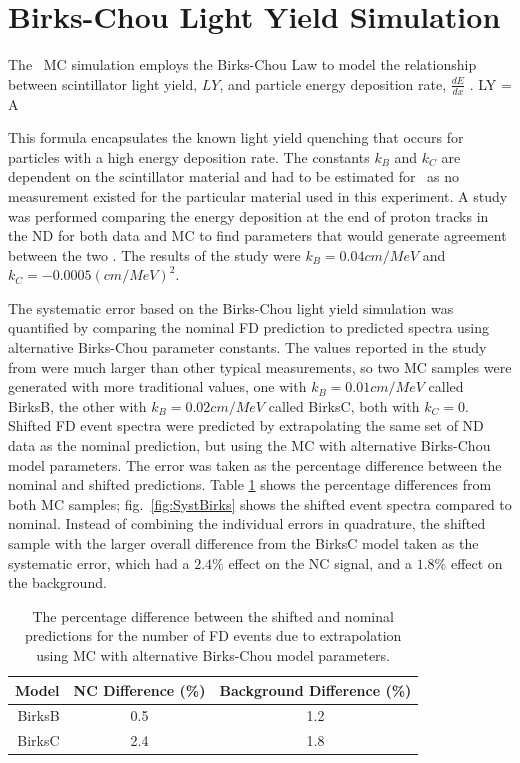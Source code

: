 \section{Birks-Chou Light Yield Simulation}

The \nova~MC simulation employs the Birks-Chou Law to model the relationship between scintillator light yield, $LY$, and particle energy deposition rate, $\frac{dE}{dx}$ \cite{ref:BirksChou}. 
\beq
LY = A  
\label{eq:BirksChou}
\eeq

\n This formula encapsulates the known light yield quenching that occurs for particles with a high energy deposition rate. The constants $k_B$ and $k_C$ are dependent on the scintillator material and had to be estimated for \nova~as no measurement existed for the particular material used in this experiment. A study was performed comparing the energy deposition at the end of proton tracks in the ND for both data and MC to find parameters that would generate agreement between the two \cite{ref:DanBirks}. The results of the study were $k_B = 0.04\unit{cm/MeV}$ and $k_C = -0.0005\unit{(cm/MeV)}^2$.

The systematic error based on the Birks-Chou light yield simulation was quantified by comparing the nominal FD prediction to predicted spectra using alternative Birks-Chou parameter constants. The values reported in the study from \cite{ref:DanBirks} were much larger than other typical measurements, so two MC samples were generated with more traditional values, one with $k_B = 0.01\unit{cm/MeV}$ called BirksB, the other with $k_B = 0.02\unit{cm/MeV}$ called BirksC, both with $k_C = 0$. Shifted FD event spectra were predicted by extrapolating the same set of ND data as the nominal prediction, but using the MC with alternative Birks-Chou model parameters. The error was taken as the percentage difference between the nominal and shifted predictions. Table \ref{tab:SystBirks} shows the percentage differences from both MC samples; fig.~\ref{fig:SystBirks} shows the shifted event spectra compared to nominal. Instead of combining the individual errors in quadrature, the shifted sample with the larger overall difference from the BirksC model taken as the systematic error, which had a $2.4\%$ effect on the NC signal, and a $1.8\%$ effect on the background.
\begin{table}[h]
  \begin{center}
    \caption[Birks-Chou Systematic Errors]{The percentage difference between the shifted and nominal predictions for the number of FD events due to extrapolation using MC with alternative Birks-Chou model parameters.}
    \label{tab:SystBirks}
    \begin{tabular}{r c c}
      \hline\hline
      Model & NC Difference (\%) & Background Difference (\%) \\
      \hline
      BirksB & 0.5 & 1.2 \\
      BirksC & 2.4 & 1.8 \\
      \hline
    \end{tabular}
  \end{center}
\end{table}

